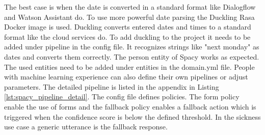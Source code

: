 The best case is when the date is converted in a standard format like 
Dialogflow and Watson Assistant do.
To use more powerful date parsing the Duckling\cite{duckling} Rasa Docker image is used.
Duckling converts entered dates and times to a standard format like the cloud services do.
To add duckling to the project it needs to be added under pipeline in the 
config file.
It recognizes strings like "next monday" as dates and converts them correctly.
The person entity of Spacy works as expected.
The used entities need to be added under entities in the domain.yml file.
People with machine learning experience can also define their own pipelines or adjust parameters.
The detailed pipeline is listed in the appendix in Listing \ref{lst:spacy_pipeline_detail}.
The config file defines policies.
The form policy enable the use of forms and the fallback policy enables 
a fallback action which is triggered when the confidence score is below 
the defined threshold. 
In the sickness use case a generic utterance is the fallback response. 


